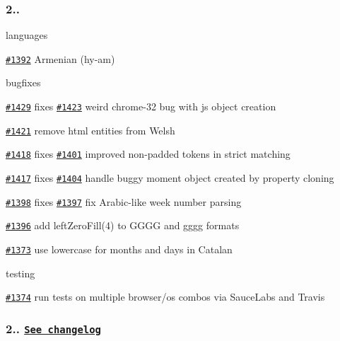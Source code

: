 \subsubsection*{2..}


\begin{DoxyItemize}
\item languages
\begin{DoxyItemize}
\item \href{https://github.com/moment/moment/issues/1392}{\tt \#1392} Armenian (hy-\/am)
\end{DoxyItemize}
\item bugfixes
\begin{DoxyItemize}
\item \href{https://github.com/moment/moment/issues/1429}{\tt \#1429} fixes \href{https://github.com/moment/moment/issues/1423}{\tt \#1423} weird chrome-\/32 bug with js object creation
\item \href{https://github.com/moment/moment/issues/1421}{\tt \#1421} remove html entities from Welsh
\item \href{https://github.com/moment/moment/issues/1418}{\tt \#1418} fixes \href{https://github.com/moment/moment/issues/1401}{\tt \#1401} improved non-\/padded tokens in strict matching
\item \href{https://github.com/moment/moment/issues/1417}{\tt \#1417} fixes \href{https://github.com/moment/moment/issues/1404}{\tt \#1404} handle buggy moment object created by property cloning
\item \href{https://github.com/moment/moment/issues/1398}{\tt \#1398} fixes \href{https://github.com/moment/moment/issues/1397}{\tt \#1397} fix Arabic-\/like week number parsing
\item \href{https://github.com/moment/moment/issues/1396}{\tt \#1396} add left\+Zero\+Fill(4) to G\+G\+GG and gggg formats
\item \href{https://github.com/moment/moment/issues/1373}{\tt \#1373} use lowercase for months and days in Catalan
\end{DoxyItemize}
\item testing
\begin{DoxyItemize}
\item \href{https://github.com/moment/moment/issues/1374}{\tt \#1374} run tests on multiple browser/os combos via Sauce\+Labs and Travis
\end{DoxyItemize}
\end{DoxyItemize}

\subsubsection*{2.. \href{https://gist.github.com/ichernev/8104451}{\tt See changelog}}


